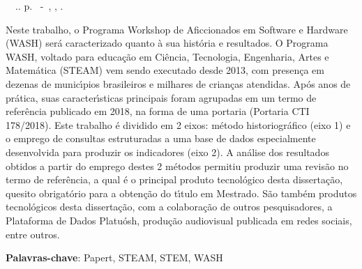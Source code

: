 \setlength{\absparsep}{18pt} %
\begin{resumo}
\begin{flushleft} 
\setlength{\absparsep}{0pt} %
\SingleSpacing 
\imprimirautorabr~~\textbf{\imprimirtituloresumo}.\imprimirdata. \pageref{LastPage}p. 
\imprimirtipotrabalho~-~\imprimirinstituicao, \imprimirlocal, \imprimirdata. 
 \end{flushleft}
\OnehalfSpacing 
Neste trabalho, o Programa Workshop de Aficcionados em Software e Hardware (WASH) ser\'a caracterizado quanto \`a sua hist\'oria e resultados. O Programa WASH, voltado para educa\c{c}\~ao em Ci\^encia, Tecnologia, Engenharia, Artes e Matem\'atica (STEAM) vem sendo executado desde 2013, com presen\c{c}a em dezenas de munic\'{\i}pios brasileiros e milhares de crian\c{c}as atendidas. Ap\'os anos de pr\'atica, suas caracter\'{\i}sticas principais foram agrupadas em um termo de refer\^encia publicado em 2018, na forma de uma portaria (Portaria CTI 178/2018). Este trabalho \'e dividido em 2 eixos: m\'etodo historiogr\'afico (eixo 1) e o emprego de consultas estruturadas a uma base de dados especialmente desenvolvida para produzir os indicadores (eixo 2). A an\'alise dos resultados obtidos a partir do emprego destes 2 m\'etodos permitiu produzir uma revis\~ao no termo de refer\^encia, a qual \'e o principal produto tecnol\'ogico desta disserta\c{c}\~ao, quesito obrigat\'orio para a obten\c{c}\~ao do t\'{\i}tulo em Mestrado. S\~ao tamb\'em produtos tecnol\'ogicos desta disserta\c{c}\~ao, com a colabora\c{c}\~ao de outros pesquisadores, a Plataforma de Dados Platu\'osh, produ\c{c}\~ao audiovisual publicada em redes sociais, entre outros.
 

 \textbf{Palavras-chave}: Papert, STEAM, STEM, WASH
\end{resumo}
